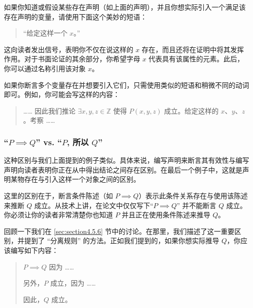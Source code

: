 如果你知道或假设某些存在声明（如上面的声明），并且你想实际引入一个满足该存在声明的变量，请使用下面这个美妙的短语：
\begin{quote}
    ``给定这样一个 $x$。''
\end{quote}
这向读者发出信号，表明你不仅在说这样的 $x$ 存在，而且还将在证明中将其发挥作用。对于书面论证的其余部分，你希望字母 $x$ 代表具有该属性的元素。此后，你可以通过名称引用该对象 $x$。

如果你断言多个变量存在并想要引入它们，只需使用类似的短语和稍微不同的动词即可。例如，你可能会写这样的内容：
\begin{quote}
    …… 因此我们推论 $\exists x, y, z \in \mathbb{Z}$ 使得 $P(x, y, z)$ 成立。给定这样的 $x、y、z$。考察 ……
\end{quote}

\subsubsection*{``$P \implies Q$'' vs. ``$P$, 所以 $Q$''}

这种区别与我们上面提到的例子类似。具体来说，编写声明来断言其有效性与编写声明向读者表明你正在从中得出结论之间存在区别。在最后一个例子中，这就是声明某物存在与引入这样一个对象之间的区别。

这里的区别在于，断言条件陈述（如 $P \implies Q$）表示此条件关系存在与使用该陈述来推断 $Q$ 成立。从技术上讲，在论文中仅仅写下``$P \implies Q$'' 并不能断言 $Q$ 成立。你必须让你的读者非常清楚你也知道 $P$ 并且正在使用条件陈述来推导 $Q$。

回顾一下我们在 \ref{sec:section4.5.6} 节中的讨论。在那里，我们描述了这一重要区别，并提到了 ``分离规则'' 的方法。正如我们提到的，如果你想实际推导 $Q$，你应该编写如下内容：
\begin{quote}
    $P \implies Q$ 因为 ……

    另外，$P$ 成立，因为 ……

    因此，$Q$ 成立。
\end{quote}